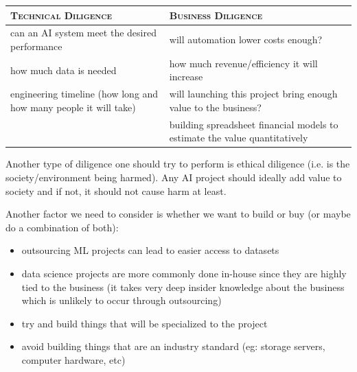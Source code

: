 \documentclass{article}[a4paper,12pt]
\theoremstyle{definition}
\begin{document}
\begin{center}
\begin{tabular}{|p{21.5em}|p{21.5em}|}
\hline
\textsc{Technical Diligence} & \textsc{Business Diligence}\\
\hline
can an AI system meet the desired performance & will automation lower costs enough?\\
\hline
how much data is needed & how much revenue/efficiency it will increase\\
\hline
engineering timeline (how long and how many people it will take) & will launching this project bring enough value to the business?\\
\hline
 & building spreadsheet financial models to estimate the value quantitatively\\
\hline
\end{tabular}
\end{center}
Another type of diligence one should try to perform is ethical diligence (i.e. is the society/environment being harmed). Any AI project should ideally add value to society and if not, it should not cause harm at least.
\vspace{6pt}

Another factor we need to consider is whether we want to build or buy (or maybe do a combination of both):
\begin{itemize}
	\item outsourcing ML projects can lead to easier access to datasets
	\item data science projects are more commonly done in-house since they are highly tied to the business (it takes very deep insider knowledge about the business which is unlikely to occur through outsourcing)
	\item try and build things that will be specialized to the project
	\item avoid building things that are an industry standard (eg: storage servers, computer hardware, etc)
\end{itemize}
\end{document}
